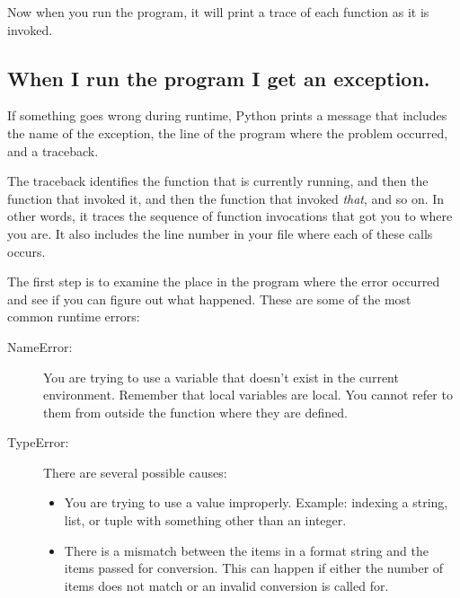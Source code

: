 \documentclass[10pt]{book}
\begin{document}
{Now when you run the program, it will print a trace of each
function as it is invoked.


\subsection{When I run the program I get an exception.}

If something goes wrong during runtime, Python
prints a message that includes the name of the
exception, the line of the program where the problem occurred,
and a traceback.


The traceback identifies the function that is currently running,
and then the function that invoked it, and then the function that
invoked {\em that}, and so on.  In other words, it traces the
sequence of function invocations that got you to where you are.  It
also includes the line number in your file where each of these
calls occurs.

The first step is to examine the place in the program where
the error occurred and see if you can figure out what happened.
These are some of the most common runtime errors:

\begin{description}

\item[NameError:]  You are trying to use a variable that doesn't
exist in the current environment.
Remember that local variables are local.  You
cannot refer to them from outside the function where they are defined.


\item[TypeError:] There are several possible causes:

\begin{itemize}

\item  You are trying to use a value improperly.  Example: indexing
a string, list, or tuple with something other than an integer.


\item There is a mismatch between the items in a format string and
the items passed for conversion.  This can happen if either the number
of items does not match or an invalid conversion is called for.


\end{itemize}
\end{description}}
\end{document}
